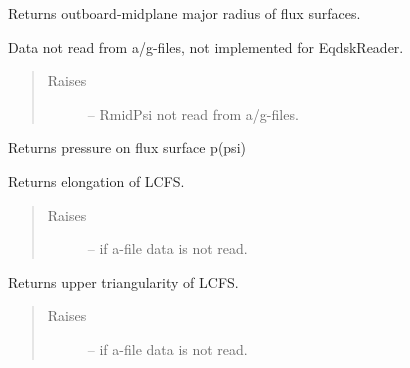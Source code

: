 \documentclass[letterpaper,10pt,english]{sphinxmanual}
\begin{document}
\begin{fulllineitems}
\begin{fulllineitems}
\end{fulllineitems}


\begin{fulllineitems}
\label{eqtools:eqtools.eqdskreader.EqdskReader.getRmidPsi}
Returns outboard-midplane major radius of flux surfaces.

Data not read from a/g-files, not implemented for EqdskReader.
\begin{quote}\begin{description}
\item[{Raises }] \leavevmode
{} -- 
RmidPsi not read from a/g-files.

\end{description}\end{quote}

\end{fulllineitems}


\begin{fulllineitems}
\label{eqtools:eqtools.eqdskreader.EqdskReader.getFluxPres}
Returns pressure on flux surface p(psi)

\end{fulllineitems}


\begin{fulllineitems}
\label{eqtools:eqtools.eqdskreader.EqdskReader.getElongation}
Returns elongation of LCFS.
\begin{quote}\begin{description}
\item[{Raises }] \leavevmode
{} -- 
if a-file data is not read.

\end{description}\end{quote}

\end{fulllineitems}


\begin{fulllineitems}
\label{eqtools:eqtools.eqdskreader.EqdskReader.getUpperTriangularity}
Returns upper triangularity of LCFS.
\begin{quote}\begin{description}
\item[{Raises }] \leavevmode
{} -- 
if a-file data is not read.


\end{description}
\end{quote}
\end{fulllineitems}
\end{fulllineitems}
\end{document}
